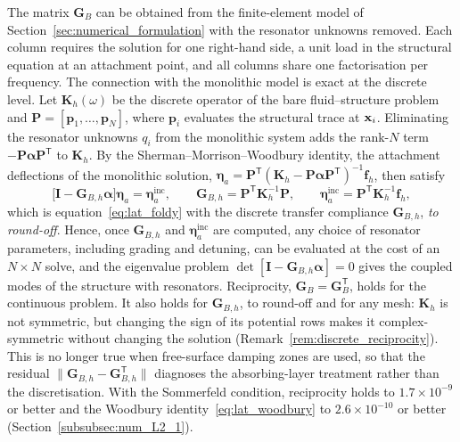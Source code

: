 The matrix $\mathbf{G}_B$ can be obtained from the finite-element model of Section~\ref{sec:numerical_formulation} with the resonator unknowns removed. Each column requires the solution for one right-hand side, a unit load in the structural equation at an attachment point, and all columns share one factorisation per frequency. The connection with the monolithic model is exact at the discrete level. Let $\mathbf{K}_h(\omega)$ be the discrete operator of the bare fluid--structure problem and $\mathbf{P}=[\mathbf{p}_1,\ldots,\mathbf{p}_N]$, where $\mathbf{p}_i$ evaluates the structural trace at $\mathbf{x}_i$. Eliminating the resonator unknowns $q_i$ from the monolithic system adds the rank-$N$ term $-\mathbf{P}\boldsymbol{\alpha}\mathbf{P}^{\mathsf{T}}$ to $\mathbf{K}_h$. By the Sherman--Morrison--Woodbury identity, the attachment deflections of the monolithic solution, $\boldsymbol{\eta}_a=\mathbf{P}^{\mathsf{T}}(\mathbf{K}_h-\mathbf{P}\boldsymbol{\alpha}\mathbf{P}^{\mathsf{T}})^{-1}\mathbf{f}_h$, then satisfy
\begin{equation}\label{eq:lat_woodbury}
    \bigl[\mathbf{I}-\mathbf{G}_{B,h}\boldsymbol{\alpha}\bigr]\boldsymbol{\eta}_a=\boldsymbol{\eta}_a^{\mathrm{inc}},
    \qquad
    \mathbf{G}_{B,h}=\mathbf{P}^{\mathsf{T}}\mathbf{K}_h^{-1}\mathbf{P},
    \qquad
    \boldsymbol{\eta}_a^{\mathrm{inc}}=\mathbf{P}^{\mathsf{T}}\mathbf{K}_h^{-1}\mathbf{f}_h,
\end{equation}
which is equation~\eqref{eq:lat_foldy} with the discrete transfer compliance $\mathbf{G}_{B,h}$, \emph{to round-off}. Hence, once $\mathbf{G}_{B,h}$ and $\boldsymbol{\eta}_a^{\mathrm{inc}}$ are computed, any choice of resonator parameters, including grading and detuning, can be evaluated at the cost of an $N\times N$ solve, and the eigenvalue problem $\det[\mathbf{I}-\mathbf{G}_{B,h}\boldsymbol{\alpha}]=0$ gives the coupled modes of the structure with resonators. Reciprocity, $\mathbf{G}_B=\mathbf{G}_B^{\mathsf{T}}$, holds for the continuous problem. It also holds for $\mathbf{G}_{B,h}$, to round-off and for any mesh: $\mathbf{K}_h$ is not symmetric, but changing the sign of its potential rows makes it complex-symmetric without changing the solution (Remark~\ref{rem:discrete_reciprocity}). This is no longer true when free-surface damping zones are used, so that the residual $\|\mathbf{G}_{B,h}-\mathbf{G}_{B,h}^{\mathsf{T}}\|$ diagnoses the absorbing-layer treatment rather than the discretisation. {\color{red}With the Sommerfeld condition, reciprocity holds to $1.7\times10^{-9}$ or better and the Woodbury identity~\eqref{eq:lat_woodbury} to $2.6\times10^{-10}$ or better (Section~\ref{subsubsec:num_L2_1}).}

